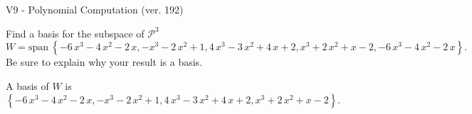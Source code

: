 \begin{exercise}
  \begin{exerciseTitle}V9 - Polynomial Computation (ver. 192)\end{exerciseTitle}
  \begin{exerciseStatement}
    Find a basis for the subspace of \(\mathcal{P}^3\) 
\[W=\mathrm{span}\ \left\{-6 \, x^{3} - 4 \, x^{2} - 2 \, x , -x^{3} - 2 \, x^{2} + 1 , 4 \, x^{3} - 3 \, x^{2} + 4 \, x + 2 , x^{3} + 2 \, x^{2} + x - 2 , -6 \, x^{3} - 4 \, x^{2} - 2 \, x\right\}.\]
 Be sure to explain why your result is a basis.


  \end{exerciseStatement}
  \begin{exerciseAnswer}
   A basis of \(W\) is  \(\left\{-6 \, x^{3} - 4 \, x^{2} - 2 \, x , -x^{3} - 2 \, x^{2} + 1 , 4 \, x^{3} - 3 \, x^{2} + 4 \, x + 2 , x^{3} + 2 \, x^{2} + x - 2\right\}\).
  


  \end{exerciseAnswer}
\end{exercise}